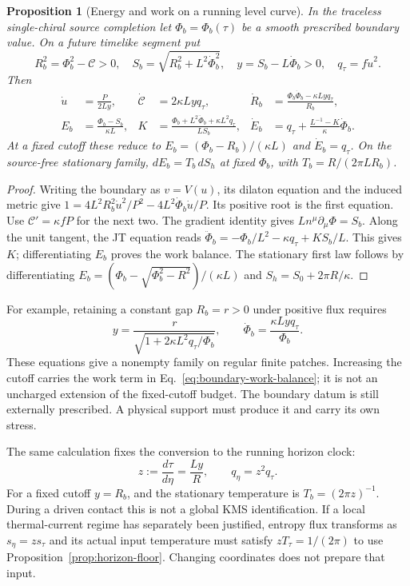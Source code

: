 \documentclass[12pt,a4paper]{article}
\newtheorem{proposition}[theorem]{Proposition}
\begin{document}
\begin{proposition}[Energy and work on a running level curve]
\label{prop:boundary-energy-work}
In the traceless single-chiral source completion let
$\Phi_b=\Phi_b(\tau)$ be a smooth prescribed boundary value. On a future
timelike segment put
\[
 R_b^2=\Phi_b^2-\mathcal C>0,\quad
 S_b=\sqrt{R_b^2+L^2\dot\Phi_b^2},\quad
 y=S_b-L\dot\Phi_b>0,\quad q_\tau=f\dot u^2.
\]
Then
\begin{align}
 \dot u&=\frac{P}{2Ly},&
 \dot{\mathcal C}&=2\kappa Lyq_\tau,&
 \dot R_b&=\frac{\Phi_b\dot\Phi_b-\kappa Lyq_\tau}{R_b},\nonumber\\
 E_b&=\frac{\Phi_b-S_b}{\kappa L},&
 K&=\frac{\Phi_b+L^2\ddot\Phi_b+\kappa L^2q_\tau}{LS_b},&
 \dot E_b&=q_\tau+\frac{L^{-1}-K}{\kappa}\dot\Phi_b .
 \label{eq:boundary-work-balance}
\end{align}
At a fixed cutoff these reduce to
$E_b=(\Phi_b-R_b)/(\kappa L)$ and $\dot E_b=q_\tau$.
On the source-free stationary family,
$dE_b=T_b\,dS_h$ at fixed $\Phi_b$, with
$T_b=R/(2\pi LR_b)$.
\end{proposition}
\begin{proof}
Writing the boundary as $v=V(u)$, its dilaton equation and the induced
metric give
$1=4L^2R_b^2\dot u^2/P^2-4L^2\dot\Phi_b\dot u/P$.
Its positive root is the first equation.
Use $\mathcal C'=\kappa fP$ for the next two.
The gradient identity gives $Ln^\mu\partial_\mu\Phi=S_b$.
Along the unit tangent, the JT equation reads
$\ddot\Phi_b=-\Phi_b/L^2-\kappa q_\tau+K S_b/L$.
This gives $K$; differentiating $E_b$ proves the work balance.
The stationary first law follows by differentiating
$E_b=(\Phi_b-\sqrt{\Phi_b^2-R^2})/(\kappa L)$ and
$S_h=S_0+2\pi R/\kappa$.
\end{proof}

For example, retaining a constant gap $R_b=r>0$ under positive flux requires
\[
 y=\frac r{\sqrt{1+2\kappa L^2q_\tau/\Phi_b}},\qquad
 \dot\Phi_b=\frac{\kappa Lyq_\tau}{\Phi_b}.
\]
These equations give a nonempty family on regular finite patches.
Increasing the cutoff carries the work term in
Eq.~\eqref{eq:boundary-work-balance}; it is not an uncharged extension of the
fixed-cutoff budget. The boundary datum is still externally prescribed.
A physical support must produce it and carry its own stress.

The same calculation fixes the conversion to the running horizon clock:
\begin{equation}\label{eq:boundary-clock-conversion}
 z:=\frac{d\tau}{d\eta}=\frac{Ly}{R},\qquad
 q_\eta=z^2q_\tau .
\end{equation}
For a fixed cutoff $y=R_b$, and the stationary temperature is
$T_b=(2\pi z)^{-1}$. During a driven contact this is not a global KMS
identification. If a local thermal-current regime has separately been
justified, entropy flux transforms as $s_\eta=z s_\tau$ and its actual
input temperature must satisfy $zT_\tau=1/(2\pi)$ to use
Proposition~\ref{prop:horizon-floor}. Changing coordinates does not prepare
that input.
\end{document}
